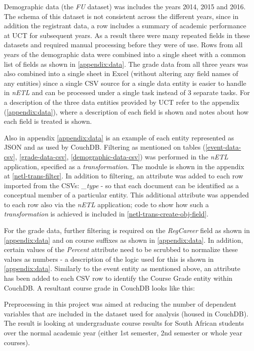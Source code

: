 Demographic data (the \textit{FU} dataset) was includes the years 2014, 2015 and 2016. The schema of this dataset is not consistent across the different years, since in addition the registrant data, a row includes a summary of academic performance at UCT for subsequent years. As a result there were many repeated fields in these datasets and required manual processing before they were of use. Rows from all years of the demographic data were combined into a single sheet with a common list of fields as shown in \ref{appendix:data}. The grade data from all three years was also combined into a single sheet in Excel (without altering any field names of any entities) since a single CSV source for a single data entity is easier to handle in \textit{nETL} and can be processed under a single task instead of 3 separate tasks. For a description of the three data entities provided by UCT refer to the appendix (\ref{appendix:data}), where a description of each field is shown and notes about how each field is treated is shown.

Also in appendix \ref{appendix:data} is an example of each entity represented as JSON and as used by CouchDB. Filtering as mentioned on tables (\ref{event-data-csv}, \ref{grade-data-csv}, \ref{demographic-data-csv}) was performed in the \textit{nETL} application, specified as a \textit{transformation}. The module is shown in the appendix at \ref{netl-trans-filter}. In addition to filtering, an attribute was added to each row imported from the CSVs: \textit{\_type} - so that each document can be identified as a conceptual member of a particular entity. This additional attribute was appended to each row also via the \textit{nETL} application; code to show how such a \textit{transformation} is achieved is included in \ref{netl-trans-create-obj-field}.

For the grade data, further filtering is required on the \textit{RegCareer} field as shown in \ref{appendix:data} and on course suffixes as shown in \ref{appendix:data}. In addition, certain values of the \textit{Percent} attribute need to be scrubbed to normalize these values as numbers - a description of the logic used for this is shown in \ref{appendix:data}. Similarly to the event entity as mentioned above, an attribute has been added to each CSV row to identify the Course Grade entity within CouchDB. A resultant course grade in CouchDB looks like this:

Preprocessing in this project was aimed at reducing the number of dependent variables that are included in the dataset used for analysis (housed in CouchDB). The result is looking at undergraduate course results for South African students over the normal academic year (either 1st semester, 2nd semester or whole year courses).